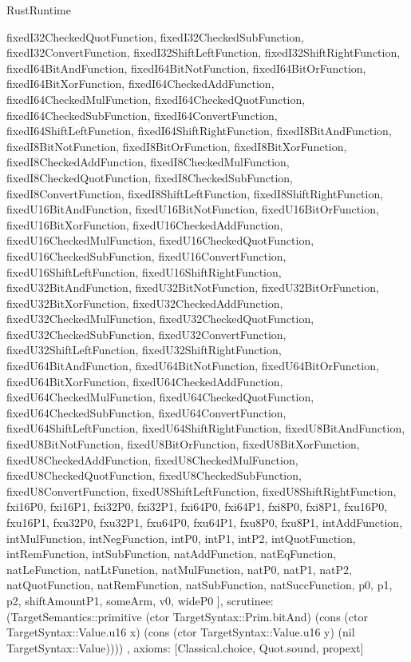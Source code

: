 \begin{lexlean}{RustRuntime}
\begin{semanticmodule}
{{      fixedI32CheckedQuotFunction,
      fixedI32CheckedSubFunction,
      fixedI32ConvertFunction,
      fixedI32ShiftLeftFunction,
      fixedI32ShiftRightFunction,
      fixedI64BitAndFunction,
      fixedI64BitNotFunction,
      fixedI64BitOrFunction,
      fixedI64BitXorFunction,
      fixedI64CheckedAddFunction,
      fixedI64CheckedMulFunction,
      fixedI64CheckedQuotFunction,
      fixedI64CheckedSubFunction,
      fixedI64ConvertFunction,
      fixedI64ShiftLeftFunction,
      fixedI64ShiftRightFunction,
      fixedI8BitAndFunction,
      fixedI8BitNotFunction,
      fixedI8BitOrFunction,
      fixedI8BitXorFunction,
      fixedI8CheckedAddFunction,
      fixedI8CheckedMulFunction,
      fixedI8CheckedQuotFunction,
      fixedI8CheckedSubFunction,
      fixedI8ConvertFunction,
      fixedI8ShiftLeftFunction,
      fixedI8ShiftRightFunction,
      fixedU16BitAndFunction,
      fixedU16BitNotFunction,
      fixedU16BitOrFunction,
      fixedU16BitXorFunction,
      fixedU16CheckedAddFunction,
      fixedU16CheckedMulFunction,
      fixedU16CheckedQuotFunction,
      fixedU16CheckedSubFunction,
      fixedU16ConvertFunction,
      fixedU16ShiftLeftFunction,
      fixedU16ShiftRightFunction,
      fixedU32BitAndFunction,
      fixedU32BitNotFunction,
      fixedU32BitOrFunction,
      fixedU32BitXorFunction,
      fixedU32CheckedAddFunction,
      fixedU32CheckedMulFunction,
      fixedU32CheckedQuotFunction,
      fixedU32CheckedSubFunction,
      fixedU32ConvertFunction,
      fixedU32ShiftLeftFunction,
      fixedU32ShiftRightFunction,
      fixedU64BitAndFunction,
      fixedU64BitNotFunction,
      fixedU64BitOrFunction,
      fixedU64BitXorFunction,
      fixedU64CheckedAddFunction,
      fixedU64CheckedMulFunction,
      fixedU64CheckedQuotFunction,
      fixedU64CheckedSubFunction,
      fixedU64ConvertFunction,
      fixedU64ShiftLeftFunction,
      fixedU64ShiftRightFunction,
      fixedU8BitAndFunction,
      fixedU8BitNotFunction,
      fixedU8BitOrFunction,
      fixedU8BitXorFunction,
      fixedU8CheckedAddFunction,
      fixedU8CheckedMulFunction,
      fixedU8CheckedQuotFunction,
      fixedU8CheckedSubFunction,
      fixedU8ConvertFunction,
      fixedU8ShiftLeftFunction,
      fixedU8ShiftRightFunction,
      fxi16P0,
      fxi16P1,
      fxi32P0,
      fxi32P1,
      fxi64P0,
      fxi64P1,
      fxi8P0,
      fxi8P1,
      fxu16P0,
      fxu16P1,
      fxu32P0,
      fxu32P1,
      fxu64P0,
      fxu64P1,
      fxu8P0,
      fxu8P1,
      intAddFunction,
      intMulFunction,
      intNegFunction,
      intP0,
      intP1,
      intP2,
      intQuotFunction,
      intRemFunction,
      intSubFunction,
      natAddFunction,
      natEqFunction,
      natLeFunction,
      natLtFunction,
      natMulFunction,
      natP0,
      natP1,
      natP2,
      natQuotFunction,
      natRemFunction,
      natSubFunction,
      natSuccFunction,
      p0,
      p1,
      p2,
      shiftAmountP1,
      someArm,
      v0,
      wideP0
    ],
    scrutinee: (TargetSemantics::primitive (ctor TargetSyntax::Prim.bitAnd) (cons (ctor TargetSyntax::Value.u16 x) (cons (ctor TargetSyntax::Value.u16 y) (nil TargetSyntax::Value))))
  },
  axioms: [Classical.choice, Quot.sound, propext]
}


\end{semanticmodule}
\end{lexlean}
